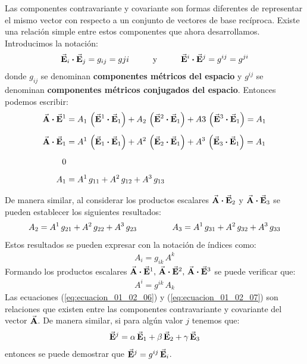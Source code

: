 \documentclass[hidelinks,12pt]{article}
\begin{document}
Las componentes contravariante y covariante son formas diferentes de representar el mismo vector con respecto a un conjunto de vectores de base recíproca. Existe una relación simple entre estos componentes que ahora desarrollamos. Introducimos la notación:
\begin{align}
\va{E}_{i} \vdot \va{E}_{j} = g_{ij} = g{ji}  \hspace{1cm} \text{y} \hspace{1cm} \va{E}^{i} \vdot \va{E}^{j} = g^{ij} = g^{ji}
\label{eq:ecuacion_01_02_03}
\end{align}
donde $g_{ij}$ se denominan \textbf{componentes métricos del espacio} y $g^{ij}$ se denominan \textbf{componentes métricos conjugados del espacio}. Entonces podemos escribir:
\begin{align}
\begin{aligned}[b]
\va{A} \vdot \va{E}^{1} &= A_{1} \, \left( \va{E}^{1} \vdot \va{E}_{1} \right) + A_{2} \, \left( \va{E}^{2} \vdot \va{E}_{1} \right) + A{3} \, \left( \va{E}^{3} \vdot\va{E}_{1} \right) = A_{1} \\[0.5em]
\va{A} \vdot \va{E}_{1} &= A^{1} \, \left( \va{E}_{1} \vdot \va{E}_{1} \right) + A^{2} \, \left( \va{E}_{2} \vdot \va{E}_{1} \right) + A^{3} \, \left( \va{E}_{3} \vdot \va{E}_{1} \right) = A_{1} \\[0.5em]
\mbox{0} &{} \\[0.5em]
A_{1} &= A^{1} \, g_{11} + A^{2} \, g_{12} + A^{3} \, g_{13}
\end{aligned}
\label{eq:ecuacion_01_02_04}
\end{align}

De manera similar, al considerar los productos escalares $\va{A} \vdot \va{E}_{2}$ y $\va{A} \vdot \va{E}_{3}$ se pueden establecer los siguientes resultados:
\begin{align*}
A_{2} = A^{1} \, g_{21} + A^{2} \, g_{22} + A^{3} \, g_{23} \hspace{1.5cm} A_{3} = A^{1} \, g_{31} + A^{2} \, g_{32} + A^{3} \, g_{33}
\end{align*}
Estos resultados se pueden expresar con la notación de índices como:
\begin{align}
A_{i} = g_{ik} \, A^{k}
\label{eq:ecuacion_01_02_06}
\end{align}
Formando los productos escalares  $\va{A} \vdot \va{E}^{1}, \, \va{A} \vdot \va{E}^{2}, \, \va{A} \vdot \va{E}^{3}$ se puede verificar que:
\begin{align}
A^{i} = g^{ik} \, A_{k}
\label{eq:ecuacion_01_02_07}
\end{align}
Las ecuaciones (\ref{eq:ecuacion_01_02_06}) y (\ref{eq:ecuacion_01_02_07}) son relaciones que existen entre las componentes contravariante y covariante del vector $\va{A}$. De manera similar, si para algún valor $j$ tenemos que:
\begin{align*}
\va{E}^{j} = \alpha \, \va{E}_{1} + \beta \, \va{E}_{2} + \gamma \, \va{E}_{3}
\end{align*}
entonces se puede demostrar que $\va{E}^{j} = g^{ij} \, \va{E}_{i}$.
\end{document}
